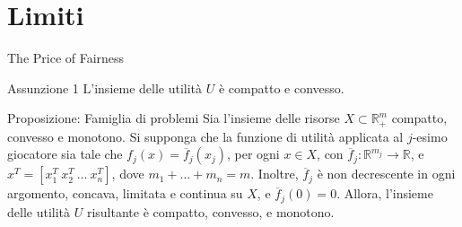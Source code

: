 \documentclass{beamer}
\begin{document}

\section{Limiti}

\begin{frame}{The Price of Fairness}
	\begin{block}{Assunzione 1} \label{A1}
		L'insieme delle utilità $U$ è compatto e convesso.
	\end{block}
	\begin{exampleblock}{Proposizione: Famiglia di problemi}
		Sia l'insieme delle risorse $X \subset \mathbb{R}^m_+$ compatto, convesso e monotono. Si supponga che la funzione di utilità applicata al $j$-esimo giocatore sia tale che $f_j(x) = \overline{f}_j(x_j)$, per ogni $x \in X$, con $\overline{f}_j: \mathbb{R}^{m_j} \rightarrow \mathbb{R}$, e $x^T = [x_1^T \ x_2^T \ \dots \ x_n^T]$, dove $m_1+\dots+m_n=m$. Inoltre, $\overline{f}_j$ è non decrescente in ogni argomento, concava, limitata e continua su $X$, e $\overline{f}_j(0)=0$. Allora, l'insieme delle utilità $U$ risultante è compatto, convesso, e monotono.
	\end{exampleblock}
\end{frame}
\end{document}
